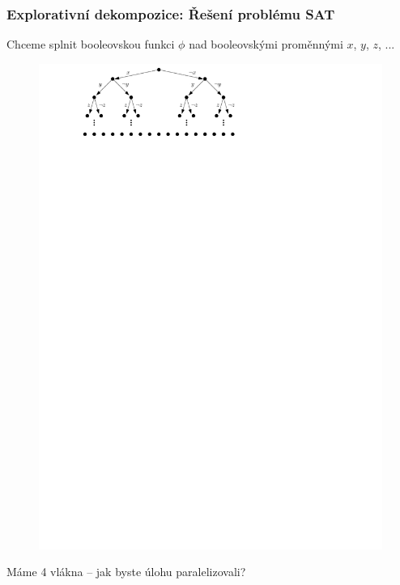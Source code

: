 \documentclass[usenames,dvipsnames,9pt]{beamer}
\begin{document}
\begin{frame}[t]
	\frametitle{Explorativní dekompozice: Řešení problému SAT}

	Chceme splnit booleovskou funkci $\phi$ nad booleovskými proměnnými $x$, $y$, $z$, ...
	\begin{figure}
		\centering\includegraphics[width=0.8\linewidth]{05/figs/sat1.pdf}
	\end{figure}

	\vspace{1em}
	\begin{center}
		\Large Máme 4 vlákna -- jak byste úlohu paralelizovali?
	\end{center}
\end{frame}
\end{document}
